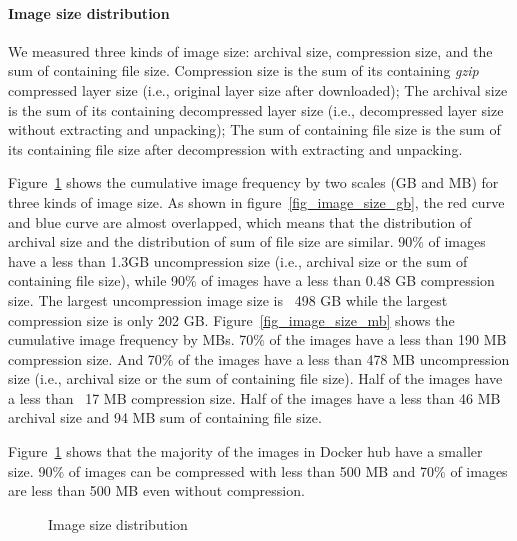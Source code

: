 \paragraph{Image size distribution}
\label{sec:image-size}
We measured three kinds of image size: archival size, compression size, and the sum of containing file size. Compression size is the sum of its containing \textit{gzip} compressed layer size (i.e., original layer size after downloaded); The archival size is the sum of its containing decompressed layer size (i.e., decompressed layer size without extracting and unpacking); The sum of containing file size is the sum of its containing file size after decompression with extracting and unpacking.

Figure~\ref{fig-image-size} shows the cumulative image frequency by two scales (GB and MB) for three kinds of image size.
As shown in figure~\ref{fig_image_size_gb}, the red curve and blue curve are almost overlapped, which means that the distribution of archival size and the distribution of sum of file size are similar. 90\% of images have a less than 1.3GB uncompression size (i.e., archival size or the sum of containing file size), while 90\% of images have a less than 0.48 GB compression size. The largest uncompression image size is ~498 GB while the largest compression size is only 202 GB.
Figure~\ref{fig_image_size_mb} shows the cumulative image frequency by MBs. 70\% of the images have a less than 190 MB compression size. And 70\% of the images have a less than 478 MB uncompression size (i.e., archival size or the sum of containing file size). Half of the images have a less than ~17 MB compression size. Half of the images have a less than 46 MB archival size and 94 MB sum of containing file size.

Figure~\ref{fig-image-size} shows that the majority of the images in Docker hub have a smaller size. 90\% of images can be compressed with less than 500 MB and 70\% of images are less than 500 MB even without compression. 

\begin{figure}[!t]
	\centering
	\caption{Image size distribution}
	\label{fig-image-size}
\end{figure}

